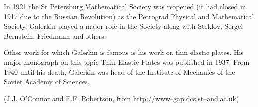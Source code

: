 In 1921 the St Petersburg Mathematical Society was reopened (it had closed in 1917 due to the Russian Revolution) as the Petrograd Physical and Mathematical Society. Galerkin played a major role in the Society along with Steklov, Sergei Bernstein, Friedmann and others. 

Other work for which Galerkin is famous is his work on thin elastic plates. His major monograph on this topic Thin Elastic Plates was published in 1937. From 1940 until his death, Galerkin was head of the Institute of Mechanics of the Soviet Academy of Sciences. 

(J.J. O'Connor and E.F. Robertson, from http://www--gap.dcs.st--and.ac.uk)
